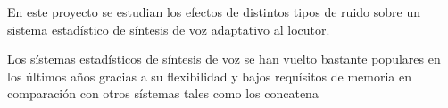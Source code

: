 \begin{resumencastellano}[english]
En este proyecto se estudian los efectos de distintos tipos de ruido sobre un sistema estad\'istico de s\'intesis de voz adaptativo al locutor.

Los s\'istemas estad\'isticos de s\'intesis de voz se han vuelto bastante populares en los \'ultimos a\~nos gracias a su flexibilidad y bajos requ\'isitos de memoria en comparaci\'on con otros s\'istemas tales como los concatena
\end{resumencastellano}